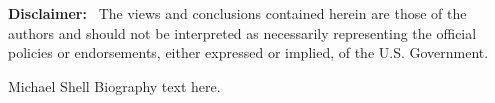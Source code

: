 \documentclass[10pt,journal,compsoc]{IEEEtran}
\begin{document}
\smallskip

\noindent
\textbf{Disclaimer:}~ The views and conclusions contained
herein are those of the authors and should
not be interpreted as necessarily representing the
official policies or endorsements, either expressed
or implied, of the U.S. Government.









%
%
%

% 

\iffalse
\begin{IEEEbiography}{Michael Shell}
Biography text here.
\end{IEEEbiography}
\end{document}
